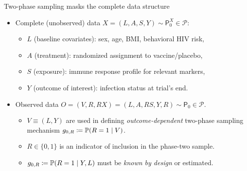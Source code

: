 \documentclass{beamer}
\begin{document}

\begin{frame}[c]{Two-phase sampling masks the complete data structure}

\begin{center}
\begin{itemize}
  \itemsep8pt
  \item Complete (unobserved) data $X = (L, A, S, Y) \sim \mathsf{P}_0^X \in
    \mathcal{P}$:
    \begin{itemize}
      \itemsep4pt
      \item $L$ (baseline covariates): sex, age, BMI, behavioral HIV risk,
      \item $A$ (treatment): randomized assignment to vaccine/placebo,
      \item $S$ (exposure): immune response profile for relevant markers,
      \item $Y$ (outcome of interest): infection status at trial's end.
    \end{itemize}
  \item Observed data $O = (V, R, RX) = (L, A, R S, Y, R) \sim \mathsf{P}_0 \in
    \mathcal{P}$.
    \begin{itemize}
      \itemsep4pt
      \item $V \equiv (L, Y)$ are used in defining \textit{outcome-dependent}
        two-phase sampling mechanism $g_{0,R} \coloneqq \mathbb{P}(R = 1 \mid V)$.
      \item $R \in \{0,1\}$ is an indicator of inclusion in the phase-two
        sample.
      \item $g_{0,R} \coloneqq \mathbb{P}(R = 1 \mid Y, L)$ must be \textit{known by
        design} or estimated.
    \end{itemize}
\end{itemize}
\end{center}


\end{frame}

\end{document}
